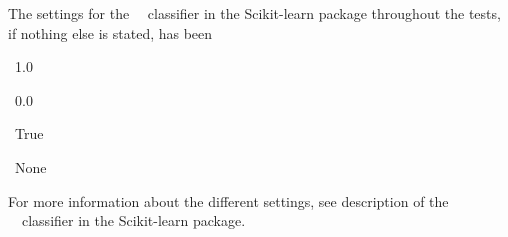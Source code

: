 The settings for the \bn\ \nb\ classifier in the Scikit-learn package throughout the tests, if nothing else is stated, has been
\begin{description}[noitemsep,labelindent=0.5cm]
\small
	\item[Alpha:] \ 1.0
	\item[Binarize:] \ 0.0
	\item[Fit prior:]\ True
	\item[Class prior:] \ None
\end{description}
For more information about the different settings, see description of the \bn\ \nb\ classifier in the Scikit-learn package.